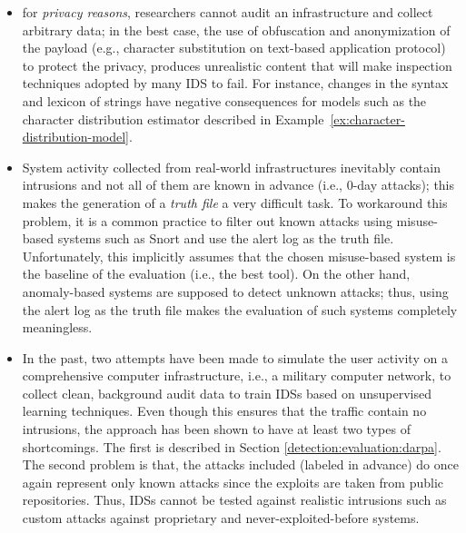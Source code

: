 \begin{itemize}
\item for \emph{privacy reasons}, researchers cannot audit an
infrastructure and collect arbitrary data; in the best case, the use
of obfuscation and anonymization of the payload (e.g., character
substitution on text-based application protocol) to protect the
privacy, produces unrealistic content that will make inspection
techniques adopted by many \ac{IDS} to fail. For instance, changes in
the syntax and lexicon of strings have negative consequences for
models such as the character distribution estimator described in
Example~\ref{ex:character-distribution-model}.
\item System activity collected from real-world infrastructures
inevitably contain intrusions and not all of them are known in advance
(i.e., 0-day attacks); this makes the generation of a \emph{truth
file} a very difficult task. To workaround this problem, it is a
common practice to filter out known attacks using misuse-based systems
such as \textsf{Snort} and use the alert log as the truth
file. Unfortunately, this implicitly assumes that the chosen
misuse-based system is the baseline of the evaluation (i.e., the best
tool). On the other hand, anomaly-based systems are supposed to detect
unknown attacks; thus, using the alert log as the truth file makes the
evaluation of such systems completely meaningless.
\item In the past, two attempts have been made to simulate the user
activity on a comprehensive computer infrastructure, i.e., a military
computer network, to collect clean, background audit data to train
\acp{IDS} based on unsupervised learning techniques. Even
though this ensures that the traffic contain no intrusions, the
approach has been shown to have at least two types of
shortcomings. The first is described in Section
\ref{detection:evaluation:darpa}. The second problem is that, the
attacks included (labeled in advance) do once again represent only
known attacks since the exploits are taken from public
repositories. Thus, \acp{IDS} cannot be tested against
realistic intrusions such as custom attacks against proprietary and
never-exploited-before systems.
\end{itemize}

